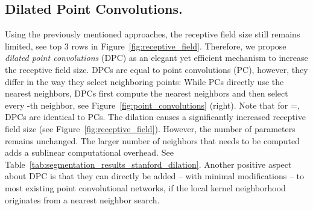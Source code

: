 \documentclass[letterpaper, 10 pt, conference]{ieeeconf}
\newcommand{\reffig}[1]{Figure~\ref{fig:#1}}
\newcommand{\reftab}[1]{Table~\ref{tab:#1}}
\begin{document}
\subsection{Dilated Point Convolutions.}
\label{sec:dilated_convolutions}
Using the previously mentioned approaches, the receptive field size still remains limited, see top 3 rows in \reffig{receptive_field}.
Therefore, we propose \emph{dilated point convolutions} (DPC) as an elegant yet efficient mechanism to increase the receptive field size.
DPCs are equal to point convolutions (PC), however, they differ in the way they select neighboring points:
While PCs directly use the  nearest neighbors, DPCs first compute the  nearest neighbors and then select every -th neighbor, see \reffig{point_convolutions} (right).
Note that for =, DPCs are identical to PCs.
The dilation causes a significantly increased receptive field size (see \reffig{receptive_field}).
However, the number of parameters remains unchanged.
The larger number  of neighbors that needs to be computed adds a sublinear computational overhead. See \reftab{segmentation_results_stanford_dilation}.
Another positive aspect about DPC is that they can directly be added -- with minimal modifications -- to most existing point convolutional networks, if the local kernel neighborhood  originates from a nearest neighbor search. 
\end{document}
